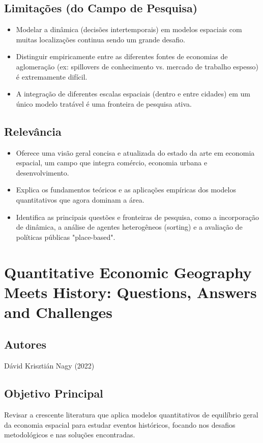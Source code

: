 \documentclass[12pt]{article}
\begin{document}
\subsection*{Limitações (do Campo de Pesquisa)}
\begin{itemize}
    \item Modelar a dinâmica (decisões intertemporais) em modelos espaciais com muitas localizações continua sendo um grande desafio.
    \item Distinguir empiricamente entre as diferentes fontes de economias de aglomeração (ex: spillovers de conhecimento vs. mercado de trabalho espesso) é extremamente difícil.
    \item A integração de diferentes escalas espaciais (dentro e entre cidades) em um único modelo tratável é uma fronteira de pesquisa ativa.
\end{itemize}

\subsection*{Relevância}
\begin{itemize}
    \item Oferece uma visão geral concisa e atualizada do estado da arte em economia espacial, um campo que integra comércio, economia urbana e desenvolvimento.
    \item Explica os fundamentos teóricos e as aplicações empíricas dos modelos quantitativos que agora dominam a área.
    \item Identifica as principais questões e fronteiras de pesquisa, como a incorporação de dinâmica, a análise de agentes heterogêneos (sorting) e a avaliação de políticas públicas "place-based".
\end{itemize}
\newpage

\section{Quantitative Economic Geography Meets History: Questions, Answers and Challenges}

\subsection*{Autores}
Dávid Krisztián Nagy (2022)

\subsection*{Objetivo Principal}
Revisar a crescente literatura que aplica modelos quantitativos de equilíbrio geral da economia espacial para estudar eventos históricos, focando nos desafios metodológicos e nas soluções encontradas.
\end{document}
